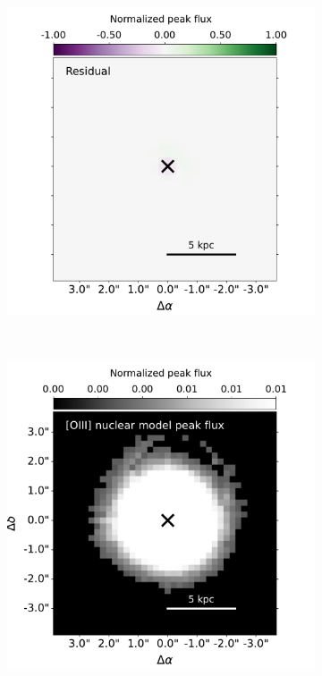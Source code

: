\begin{figure}[!t]
\begin{subfigure}[t]{0.3\linewidth}
    \end{subfigure}
    \hspace*{\fill}
    \begin{subfigure}[t]{0.3\linewidth}
        \centering
        \includegraphics[width=\textwidth, trim={2cm 0 1.5cm 0}, clip]{figures/muse_f13451_1232/nuclear_model_psf_residual.pdf}
    \end{subfigure} \\
    \begin{subfigure}[t]{0.3355\linewidth}
        \centering
        \includegraphics[width=\textwidth, trim={0 0 1.5cm 0}, clip]{figures/muse_f13451_1232/nuclear_model_psf_highcrop.pdf}

\end{subfigure}
\end{figure}
